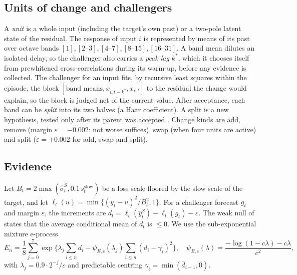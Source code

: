 \documentclass[11pt]{article}
\theoremstyle{remark}
\begin{document}
\subsection{Units of change and challengers}
A \emph{unit} is a whole input (including the target's own past) or a two-pole latent state of the residual. The response of input $i$ is represented by means of its past over octave bands $[1],[2\text{--}3],[4\text{--}7],[8\text{--}15],[16\text{--}31]$. A band mean dilutes an isolated delay, so the challenger also carries a \emph{peak lag} $k^*$, which it chooses itself from prewhitened cross-correlations during its warm-up, before any evidence is collected. The challenger for an input fits, by recursive least squares within the episode, the block $[\text{band means}, x_{i,t-k^*}, x_{i,t}]$ to the residual the change would explain, so the block is judged net of the current value. After acceptance, each band can be \emph{split} into its two halves (a Haar coefficient). A split is a new hypothesis, tested only after its parent was accepted \citep{meinshausen2008,yekutieli2008}. Change kinds are add, remove (margin $\varepsilon=-0.002$: not worse suffices), swap (when four units are active) and split ($\varepsilon=+0.002$ for add, swap and split).

\subsection{Evidence}\label{sec:evidence}
Let $B_t = 2\max(\hat\sigma^S_t, 0.1\, s^{\mathrm{slow}}_t)$ be a loss scale floored by the slow scale of the target, and let $\ell_t(u)=\min\{(y_t-u)^2/B_t^2,1\}$. For a challenger forecast $g_t$ and margin $\varepsilon$, the increments are $d_t = \ell_t(\hat y^S_t)-\ell_t(g_t)-\varepsilon$. The weak null of \citet{choe2024comparing} states that the average conditional mean of $d_t$ is $\le 0$. We use the sub-exponential mixture e-process
\begin{equation}
E_n = \frac18\sum_{j=0}^{7}\exp\Big\{\lambda_j\sum_{i\le n} d_i - \psi_{E,c}(\lambda_j)\sum_{i\le n}(d_i-\gamma_i)^2\Big\},\quad \psi_{E,c}(\lambda)=\frac{-\log(1-c\lambda)-c\lambda}{c^2},
\end{equation}
with $\lambda_j = 0.9\cdot 2^{-j}/c$ and predictable centring $\gamma_i = \min(\bar d_{i-1},0)$.
\end{document}
